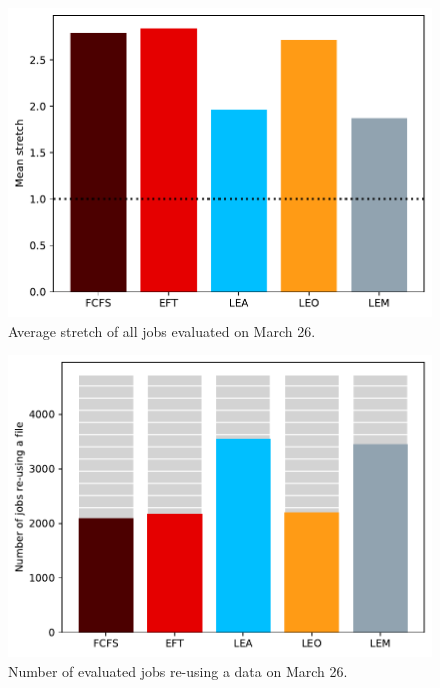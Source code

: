 \documentclass[conference,10pt]{IEEEtran}
\begin{document}
\begin{figure}[tb]\centering\includegraphics[scale=0.47]{../MBSS/plot/Results_FCFS_Score_Backfill_2022-03-26->2022-03-26_V10000_Mean_Stretch_450_128_32_256_4_1024.pdf}\caption{Average stretch of all jobs evaluated on March 26.}
\label{stretch.03-26}\end{figure}
\begin{figure}[tb]\centering\includegraphics[scale=0.47]{../MBSS/plot/Results_FCFS_Score_Backfill_2022-03-26->2022-03-26_V10000_Number_of_data_reuse_450_128_32_256_4_1024.pdf}\caption{Number of evaluated jobs re-using a data on March 26.}\label{reuse.03-26}\end{figure}
\end{document}
